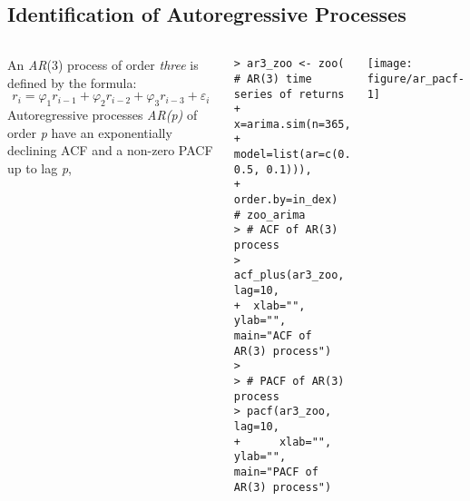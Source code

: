 \documentclass[10pt]{beamer}\usepackage[]{graphicx}\usepackage[]{color}
\makeatletter
\newenvironment{kframe}{%
 \def\at@end@of@kframe{}%
 \ifinner\ifhmode%
  \def\at@end@of@kframe{\end{minipage}}%
  \begin{minipage}{\columnwidth}%
 \fi\fi%
 \def\FrameCommand##1{\hskip\@totalleftmargin \hskip-\fboxsep
 \colorbox{shadecolor}{##1}\hskip-\fboxsep
     \hskip-\linewidth \hskip-\@totalleftmargin \hskip\columnwidth}%
 \MakeFramed {\advance\hsize-\width
   \@totalleftmargin\z@ \linewidth\hsize
   \@setminipage}}%
 {\par\unskip\endMakeFramed%
 \at@end@of@kframe}
\newenvironment{knitrout}{}{} %
\makeatother
\begin{document}
\subsection{Identification of Autoregressive Processes}
\begin{frame}[fragile,t]{\subsecname}
\vspace{-1em}
\begin{block}{}
  \begin{columns}[T]
      An \emph{AR}(3) process of order \emph{three} is defined by the formula:
      \begin{displaymath}
        r_i = \varphi_1 r_{i-1} + \varphi_2 r_{i-2} + \varphi_3 r_{i-3} + \varepsilon_i
      \end{displaymath}
      Autoregressive processes \emph{AR(p)} of order \emph{p} have an exponentially declining ACF and a non-zero PACF up to lag \emph{p},
\begin{knitrout}\scriptsize
{}\color{fgcolor}\begin{kframe}
\begin{verbatim}
> ar3_zoo <- zoo(  # AR(3) time series of returns
+   x=arima.sim(n=365,
+     model=list(ar=c(0.1, 0.5, 0.1))),
+   order.by=in_dex)  # zoo_arima
> # ACF of AR(3) process
> acf_plus(ar3_zoo, lag=10,
+  xlab="", ylab="", main="ACF of AR(3) process")
> 
> # PACF of AR(3) process
> pacf(ar3_zoo, lag=10,
+      xlab="", ylab="", main="PACF of AR(3) process")
\end{verbatim}
\end{kframe}
\end{knitrout}
      \vspace{-2em}
      \texttt{[image: figure/ar\_pacf-1]}
  \end{columns}
\end{block}

\end{frame}


\end{document}
